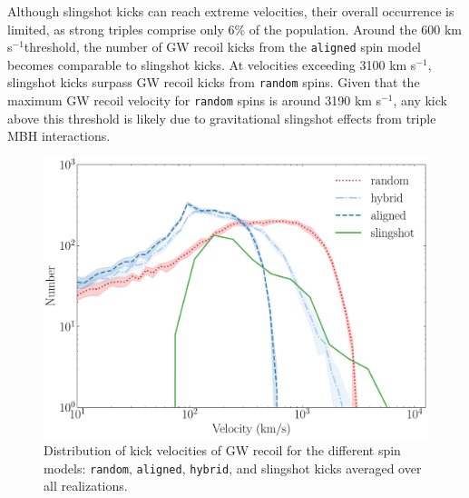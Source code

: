 \documentclass[11pt, letterpaper]{article}
\newcommand{\kms}{km s$^{-1}$}
\begin{document}
Although slingshot kicks can reach extreme velocities, their overall occurrence is limited, as strong triples comprise only 6\% of the population. Around the 600 \kms threshold, the number of GW recoil kicks from the \texttt{aligned} spin model becomes comparable to slingshot kicks. At velocities exceeding 3100 \kms, slingshot kicks surpass GW recoil kicks from \texttt{random} spins. Given that the maximum GW recoil velocity for \texttt{random} spins is around 3190 \kms, any kick above this threshold is likely due to gravitational slingshot effects from triple MBH interactions.


\begin{figure}[!htb]
    \centering
    \includegraphics[scale=0.7]{fig/v-dist-for-all-kicks.pdf}
    \caption{Distribution of kick velocities of GW recoil for the different spin models: \texttt{random}, \texttt{aligned}, \texttt{hybrid}, and slingshot kicks averaged over all realizations.}
    \label{fig:kick-distributions-for-GW-recoil-and-slingshot}
\end{figure}
\end{document}
